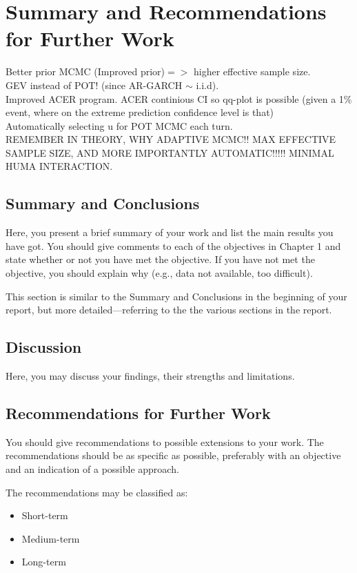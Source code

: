 \chapter[Summary]{Summary and Recommendations for Further Work}
Better prior MCMC (Improved prior)$=>$ higher effective sample size.\\
GEV instead of POT! (since AR-GARCH $\sim$ i.i.d).\\
Improved ACER program. ACER continious CI so qq-plot is possible (given a 1\% event, where on the extreme prediction confidence level is that)\\
Automatically selecting u for POT MCMC each turn.\\
REMEMBER IN THEORY, WHY ADAPTIVE MCMC!! MAX EFFECTIVE SAMPLE SIZE, AND MORE IMPORTANTLY AUTOMATIC!!!!! MINIMAL HUMA INTERACTION.\\


\section{Summary and Conclusions}
Here, you present a brief summary of your work and list the main results you have got. You should give comments to each of the objectives in Chapter 1 and state whether or not you have met the objective. If you have not met the objective, you should explain why (e.g., data not available, too difficult).

This section is similar to the Summary and Conclusions in the beginning of your report, but more detailed---referring to the the various sections in the report.

\section{Discussion}
Here, you may discuss your findings, their strengths and limitations.
\section{Recommendations for Further Work}
You should give recommendations to possible extensions to your work. The recommendations should be as specific as possible, preferably with an objective and an indication of a possible approach.

The recommendations may be classified as:
\begin{itemize}
\item Short-term
\item Medium-term
\item Long-term
\end{itemize}